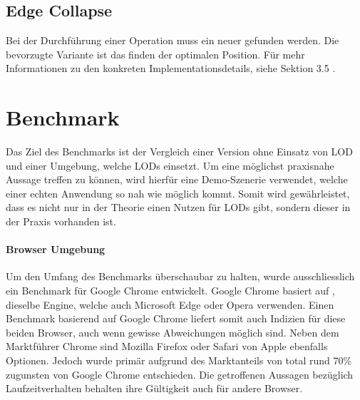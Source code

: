 \subsection{Edge Collapse}

Bei der Durchführung einer  Operation muss ein neuer  gefunden werden. Die bevorzugte Variante ist das finden der optimalen Position. Für mehr Informationen zu den konkreten Implementationsdetails, siehe  Sektion 3.5 \cite{quadridBasedSurfaceSimplification}.

\section{Benchmark}

Das Ziel des Benchmarks ist der Vergleich einer Version ohne Einsatz von LOD und einer Umgebung, welche LODs einsetzt. Um eine möglichst praxisnahe Aussage treffen zu können, wird hierfür eine Demo-Szenerie verwendet, welche einer echten Anwendung so nah wie möglich kommt. Somit wird gewährleistet, dass es nicht nur in der Theorie einen Nutzen für LODs gibt, sondern dieser in der Praxis vorhanden ist.

\paragraph{Browser Umgebung}
Um den Umfang des Benchmarks überschaubar zu halten, wurde ausschliesslich ein Benchmark für Google Chrome entwickelt.
Google Chrome basiert auf , dieselbe Engine, welche auch Microsoft Edge oder Opera verwenden.
Einen Benchmark basierend auf Google Chrome liefert somit auch Indizien für diese beiden Browser, auch wenn gewisse Abweichungen möglich sind.
Neben dem Marktführer Chrome sind Mozilla Firefox oder Safari von Apple ebenfalls Optionen. Jedoch wurde primär aufgrund des Marktanteils von total rund 70\% \cite{browserUsage} zugunsten von Google Chrome entschieden.
Die getroffenen Aussagen bezüglich Laufzeitverhalten behalten ihre Gültigkeit auch für andere Browser.

